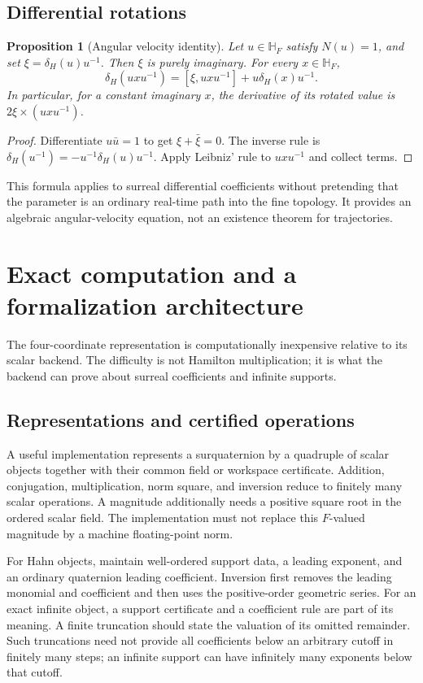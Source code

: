 \documentclass[11pt,letterpaper]{article}
\newtheorem{proposition}[theorem]{Proposition}
\theoremstyle{definition}
\newcommand{\HF}{\mathbb H_F}
\begin{document}
\subsection{Differential rotations}
\begin{proposition}[Angular velocity identity]
Let $u\in\HF$ satisfy $N(u)=1$, and set
$\xi=\delta_H(u)u^{-1}$. Then $\xi$ is purely imaginary. For every $x\in\HF$,
\begin{equation}
 \delta_H(uxu^{-1})=[\xi,uxu^{-1}]+u\delta_H(x)u^{-1}.
 \label{eq:angular-velocity}
\end{equation}
In particular, for a constant imaginary $x$, the derivative of its rotated
value is $2\xi\times(uxu^{-1})$.
\end{proposition}
\begin{proof}
Differentiate $u\bar u=1$ to get $\xi+\bar\xi=0$. The inverse rule is
$\delta_H(u^{-1})=-u^{-1}\delta_H(u)u^{-1}$. Apply Leibniz' rule to
$uxu^{-1}$ and collect terms.
\end{proof}
This formula applies to surreal differential coefficients without pretending
that the parameter is an ordinary real-time path into the fine topology.
It provides an algebraic angular-velocity equation, not an existence theorem
for trajectories.

\section{Exact computation and a formalization architecture}
\label{sec:computation}
The four-coordinate representation is computationally inexpensive relative
to its scalar backend. The difficulty is not Hamilton multiplication; it is
what the backend can prove about surreal coefficients and infinite supports.

\subsection{Representations and certified operations}
A useful implementation represents a surquaternion by a quadruple of scalar
objects together with their common field or workspace certificate. Addition,
conjugation, multiplication, norm square, and inversion reduce to finitely
many scalar operations. A magnitude additionally needs a positive square root
in the ordered scalar field. The implementation must not replace this
$F$-valued magnitude by a machine floating-point norm.

For Hahn objects, maintain well-ordered support data, a leading exponent,
and an ordinary quaternion leading coefficient. Inversion first removes the
leading monomial and coefficient and then uses the positive-order geometric
series. For an exact infinite object, a support certificate and a coefficient
rule are part of its meaning. A finite truncation should state the valuation
of its omitted remainder. Such truncations need not provide all coefficients
below an arbitrary cutoff in finitely many steps; an infinite support can
have infinitely many exponents below that cutoff.
\end{document}
